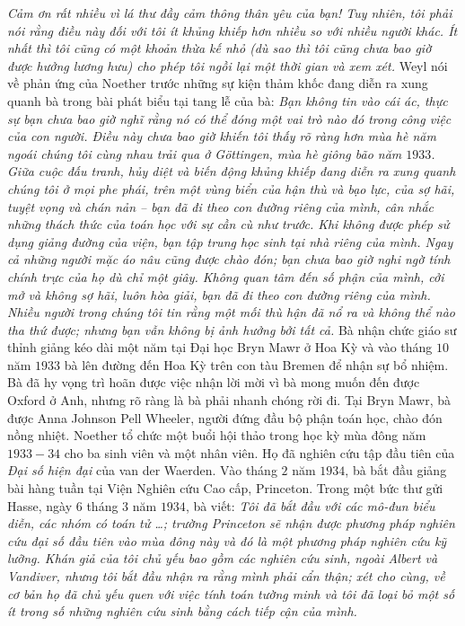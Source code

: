 \begin{multicols}{2}
	\vskip 0.05cm
	\textit{Cảm ơn rất nhiều vì lá thư đầy cảm thông thân yêu của bạn! Tuy nhiên, tôi phải nói rằng điều này đối với tôi ít khủng khiếp hơn nhiều so với nhiều người khác. Ít nhất thì tôi cũng có một khoản thừa kế nhỏ (dù sao thì tôi cũng chưa bao giờ được hưởng lương hưu) cho phép tôi ngồi lại một thời gian và xem xét.}
	\vskip 0.05cm
	Weyl nói về phản ứng của Noether trước những sự kiện thảm khốc đang diễn ra xung quanh bà trong bài phát biểu tại tang lễ của bà:
	\vskip 0.05cm
	\textit{Bạn không tin vào cái ác, thực sự bạn chưa bao giờ nghĩ rằng nó có thể đóng một vai trò nào đó trong công việc của con người. Điều này chưa bao giờ khiến tôi thấy rõ ràng hơn mùa hè năm ngoái chúng tôi cùng nhau trải qua ở Göttingen, mùa hè giông bão năm $1933$. Giữa cuộc đấu tranh, hủy diệt và biến động khủng khiếp đang diễn ra xung quanh chúng tôi ở mọi phe phái, trên một vùng biển của hận thù và bạo lực, của sợ hãi, tuyệt vọng và chán nản -- bạn đã đi theo con đường riêng của mình, cân nhắc những thách thức của toán học với sự cần cù như trước. Khi không được phép sử dụng giảng đường của viện, bạn tập trung học sinh tại nhà riêng của mình. Ngay cả những người mặc áo nâu cũng được chào đón; bạn chưa bao giờ nghi ngờ tính chính trực của họ dù chỉ một giây. Không quan tâm đến số phận của mình, cởi mở và không sợ hãi, luôn hòa giải, bạn đã đi theo con đường riêng của mình. Nhiều người trong chúng tôi tin rằng một mối thù hận đã nổ ra và không thể nào tha thứ được; nhưng bạn vẫn không bị ảnh hưởng bởi tất cả.}
	\vskip 0.05cm
	Bà nhận chức giáo sư thỉnh giảng kéo dài một năm tại Đại học Bryn Mawr ở Hoa Kỳ và vào tháng $10$ năm $1933$ bà lên đường đến Hoa Kỳ trên con tàu Bremen để nhận sự bổ nhiệm. Bà đã hy vọng trì hoãn được việc nhận lời mời vì bà mong muốn đến được Oxford ở Anh, nhưng rõ ràng là bà phải nhanh chóng rời đi. Tại Bryn Mawr, bà được Anna Johnson Pell Wheeler, người đứng đầu bộ phận toán học, chào đón nồng nhiệt. Noether tổ chức một buổi hội thảo trong học kỳ mùa đông năm $1933-34$ cho ba sinh viên và một nhân viên. Họ đã nghiên cứu tập đầu tiên của \textit{Đại số hiện đại} của van der Waerden. Vào tháng $2$ năm $1934$, bà bắt đầu giảng bài hàng tuần tại Viện Nghiên cứu Cao cấp, Princeton. Trong một bức thư gửi Hasse, ngày $6$ tháng $3$ năm $1934$, bà viết: 
	\vskip 0.05cm
	\textit{Tôi đã bắt đầu với các mô-đun biểu diễn, các nhóm có toán tử \ldots; trường Princeton sẽ nhận được phương pháp nghiên cứu đại số đầu tiên vào mùa đông này và đó là một phương pháp nghiên cứu kỹ lưỡng. Khán giả của tôi chủ yếu bao gồm các nghiên cứu sinh, ngoài Albert và Vandiver, nhưng tôi bắt đầu nhận ra rằng mình phải cẩn thận; xét cho cùng, về cơ bản họ đã chủ yếu quen với việc tính toán tường minh và tôi đã loại bỏ một số ít trong số những nghiên cứu sinh bằng cách tiếp cận của mình.}

\end{multicols}
